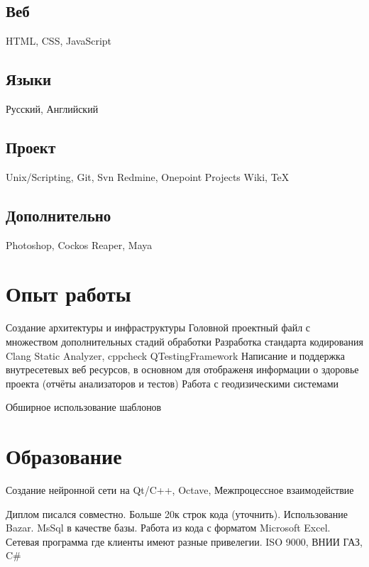 \documentclass[a4paper]{curricula-vitae}
\begin{document}
\begin{minipage}[t]{0.33\textwidth}
\subsection{Веб}
HTML, CSS, JavaScript

\subsection{Языки}
Русский, Английский

\subsection{Проект}
Unix/Scripting, Git, Svn
Redmine, Onepoint Projects
Wiki, TeX

\subsection{Дополнительно}
Photoshop, 
Cockos Reaper, 
Maya

\end{minipage} %
\hfill
\begin{minipage}[t]{0.66\textwidth} %

\section{Опыт работы} 

Создание архитектуры и инфраструктуры
Головной проектный файл с множеством дополнительных стадий обработки
Разработка стандарта кодирования
Clang Static Analyzer, cppcheck
QTestingFramework
Написание и поддержка внутресетевых веб ресурсов, в основном для отображеня
информации о здоровье проекта (отчёты анализаторов и тестов)
Работа с геодизическими системами

Обширное использование шаблонов

\section{Образование} 

Создание нейронной сети на Qt/C++, Octave, Межпроцессное взаимодействие

Диплом писался совместно. Больше 20к строк кода (уточнить). Использование Bazar.
MsSql в качестве базы. Работа из кода с форматом Microsoft Excel.
Сетевая программа где клиенты имеют разные привелегии.
ISO 9000, ВНИИ ГАЗ, C\#

\end{minipage} %

\end{document}
